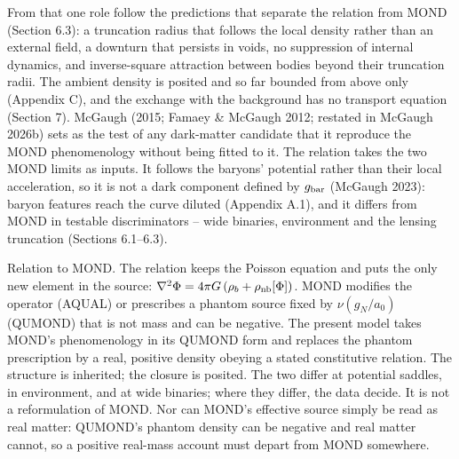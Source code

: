\documentclass[
  10pt,
]{article}
\begin{document}
From that one role follow the predictions that separate the relation from MOND (Section 6.3): a truncation radius that follows the local density rather than an external field, a downturn that persists in voids, no suppression of internal dynamics, and inverse-square attraction between bodies beyond their truncation radii. The ambient density is posited and so far bounded from above only (Appendix C), and the exchange with the background has no transport equation (Section 7). McGaugh (2015; Famaey \& McGaugh 2012; restated in McGaugh 2026b) sets as the test of any dark-matter candidate that it reproduce the MOND phenomenology without being fitted to it. The relation takes the two MOND limits as inputs. It follows the baryons' potential rather than their local acceleration, so it is not a dark component defined by $g_{\rm bar}$ (McGaugh 2023): baryon features reach the curve diluted (Appendix A.1), and it differs from MOND in testable discriminators -- wide binaries, environment and the lensing truncation (Sections 6.1--6.3).

Relation to MOND. The relation keeps the Poisson equation and puts the only
new element in the source: $\nabla^2\Phi = 4\pi G\,(\rho_b+\rho_{\rm nb}[\Phi])$. MOND modifies the operator (AQUAL) or
prescribes a phantom source fixed by $\nu(g_N/a_0)$ (QUMOND) that is not
mass and can be negative. The present model takes MOND's phenomenology in
its QUMOND form and replaces the phantom prescription by a real,
positive density obeying a stated constitutive relation. The structure
is inherited; the closure is posited. The two differ at
potential
saddles, in environment, and at wide binaries; where they differ, the
data decide. It is not a reformulation of MOND. Nor can MOND's effective source simply be read as real matter: QUMOND's phantom density can be negative and real matter cannot, so a positive real-mass account must depart from MOND somewhere.
\end{document}
